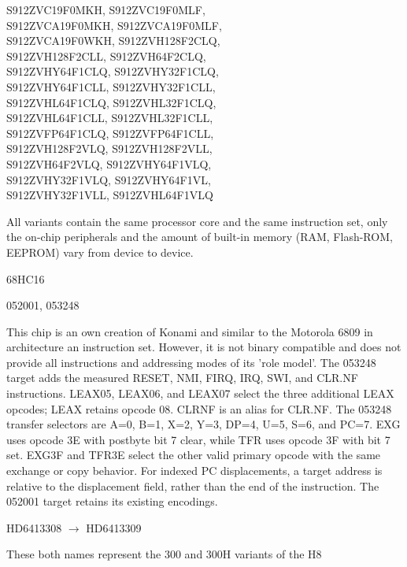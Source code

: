 \documentclass[12pt,twoside]{report}
\begin{document}
\begin{cpulist}
   S912ZVC19F0MKH, S912ZVC19F0MLF,\\
\> S912ZVCA19F0MKH, S912ZVCA19F0MLF,\\
\> S912ZVCA19F0WKH, S912ZVH128F2CLQ,\\
\> S912ZVH128F2CLL, S912ZVH64F2CLQ,\\
\> S912ZVHY64F1CLQ, S912ZVHY32F1CLQ,\\
\> S912ZVHY64F1CLL, S912ZVHY32F1CLL,\\
\> S912ZVHL64F1CLQ, S912ZVHL32F1CLQ,\\
\> S912ZVHL64F1CLL, S912ZVHL32F1CLL,\\
\> S912ZVFP64F1CLQ, S912ZVFP64F1CLL,\\
\> S912ZVH128F2VLQ, S912ZVH128F2VLL,\\
\> S912ZVH64F2VLQ, S912ZVHY64F1VLQ,\\
\> S912ZVHY32F1VLQ, S912ZVHY64F1VL,\\
\> S912ZVHY32F1VLL, S912ZVHL64F1VLQ
\end{cpulist}
All variants contain the same processor core and the same
instruction set, only the on-chip peripherals and the
amount of built-in memory (RAM, Flash-ROM, EEPROM)
vary from device to device.
\begin{cpulist}
   68HC16
\end{cpulist}
\begin{cpulist}
   052001, 053248
\end{cpulist}
This chip is an own creation of Konami and similar to the
Motorola 6809 in architecture an instruction set.  However,
it is not binary compatible and does not provide all instructions
and addressing modes of its 'role model'.
The 053248 target adds the measured RESET, NMI, FIRQ, IRQ, SWI, and
CLR.NF instructions.  LEAX05, LEAX06, and LEAX07 select the three
additional LEAX opcodes; LEAX retains opcode 08.  CLRNF is an alias
for CLR.NF.  The 053248 transfer selectors are A=0, B=1, X=2, Y=3,
DP=4, U=5, S=6, and PC=7.  EXG uses opcode 3E with postbyte bit 7
clear, while TFR uses opcode 3F with bit 7 set.  EXG3F and TFR3E
select the other valid primary opcode with the same exchange or copy
behavior.  For indexed PC displacements, a target address is relative
to the displacement field, rather than the end of the instruction.
The 052001 target retains its existing encodings.
\begin{cpulist}
   HD6413308 $\rightarrow$ HD6413309
\end{cpulist}
These both names represent the 300 and 300H variants of the H8
\end{document}
